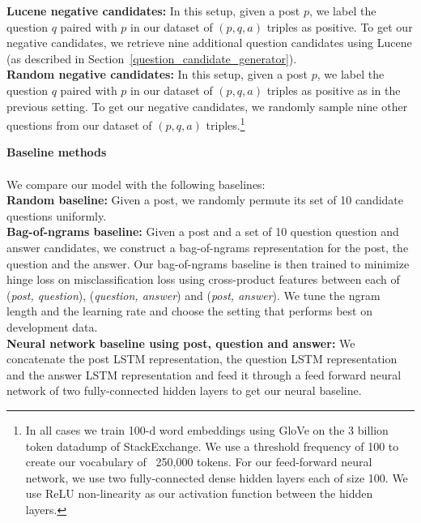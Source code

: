 \documentclass[11pt]{article}
\begin{document}
\textbf{Lucene negative candidates:} In this setup, given a post $p$, we label the question $q$ paired with $p$ in our dataset of $(p, q, a)$ triples as positive. To get our negative candidates, we retrieve nine additional question candidates using Lucene (as described in Section~\ref{question_candidate_generator}).\\
\textbf{Random negative candidates:} In this setup, given a post $p$, we label the question $q$ paired with $p$ in our dataset of $(p, q, a)$ triples as positive as in the previous setting. To get our negative candidates, we randomly sample nine other questions from our dataset of $(p, q, a)$ triples.\footnote{In all cases we train 100-d word embeddings using GloVe \cite{pennington2014glove} on the 3 billion token datadump of StackExchange. We use a threshold frequency of 100 to create our vocabulary of ~250,000 tokens. For our feed-forward neural network, we use two fully-connected dense hidden layers each of size 100. We use ReLU \cite{nair2010rectified} non-linearity as our activation function between the hidden layers.}


\textbf{Baseline methods}\label{baselines}\\\\

We compare our model with the following baselines:\\
\textbf{Random baseline:} Given a post, we randomly permute its set of 10 candidate questions uniformly.\\
\textbf{Bag-of-ngrams baseline:} Given a post and a set of 10 question question and answer candidates, we construct a bag-of-ngrams representation for the post, the question and the answer. Our bag-of-ngrams baseline is then trained to minimize hinge loss on misclassification loss using cross-product features between each of (\textit{post, question}), (\textit{question, answer}) and (\textit{post, answer}). We tune the ngram length and the learning rate and choose the setting that performs best on development data.\\
\textbf{Neural network baseline using post, question and answer:} We concatenate the post LSTM representation, the question LSTM representation and the answer LSTM representation and feed it through a feed forward neural network of two fully-connected hidden layers to get our neural baseline. 
\end{document}
